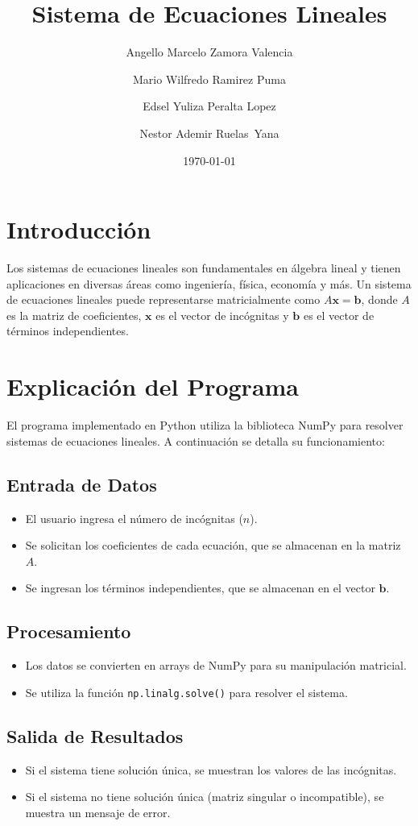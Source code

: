 \documentclass{article}
\title{Sistema de Ecuaciones Lineales}
\author[1]{Angello Marcelo Zamora Valencia}
\author[2]{Mario Wilfredo Ramirez Puma}
\author[3]{Edsel Yuliza Peralta Lopez}
\author[4]{Nestor Ademir Ruelas Yana}
\affil[1]{Universidad Nacional del Altiplano Puno}
\affil[2]{Facultad de Ingeniería Estadística e Informática}
\date{\today}
\begin{document}
	
	\maketitle
	
	\section{Introducción}
	Los sistemas de ecuaciones lineales son fundamentales en álgebra lineal y tienen aplicaciones en diversas áreas como ingeniería, física, economía y más. Un sistema de ecuaciones lineales puede representarse matricialmente como $A\mathbf{x} = \mathbf{b}$, donde $A$ es la matriz de coeficientes, $\mathbf{x}$ es el vector de incógnitas y $\mathbf{b}$ es el vector de términos independientes.
	
	\section{Explicación del Programa}
	El programa implementado en Python utiliza la biblioteca NumPy para resolver sistemas de ecuaciones lineales. A continuación se detalla su funcionamiento:
	
	\subsection{Entrada de Datos}
	\begin{itemize}
		\item El usuario ingresa el número de incógnitas ($n$).
		\item Se solicitan los coeficientes de cada ecuación, que se almacenan en la matriz $A$.
		\item Se ingresan los términos independientes, que se almacenan en el vector $\mathbf{b}$.
	\end{itemize}
	
	\subsection{Procesamiento}
	\begin{itemize}
		\item Los datos se convierten en arrays de NumPy para su manipulación matricial.
		\item Se utiliza la función \texttt{np.linalg.solve()} para resolver el sistema.
	\end{itemize}
	
	\subsection{Salida de Resultados}
	\begin{itemize}
		\item Si el sistema tiene solución única, se muestran los valores de las incógnitas.
		\item Si el sistema no tiene solución única (matriz singular o incompatible), se muestra un mensaje de error.
	\end{itemize}
	
\end{document}
